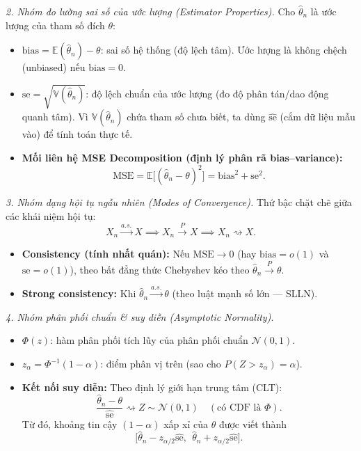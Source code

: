 \textit{2. Nhóm đo lường sai số của ước lượng (Estimator Properties).} Cho $\widehat\theta_n$ là ước lượng của tham số đích $\theta$:
\begin{itemize}
\item $\mathrm{bias}=\mathbb{E}(\widehat\theta_n)-\theta$: sai số hệ thống (độ lệch tâm). Ước lượng là không chệch (unbiased) nếu $\mathrm{bias}=0$.
\item $\mathrm{se}=\sqrt{\mathbb{V}(\widehat\theta_n)}$: độ lệch chuẩn của ước lượng (đo độ phân tán/dao động quanh tâm). Vì $\mathbb{V}(\widehat\theta_n)$ chứa tham số chưa biết, ta dùng $\widehat{\mathrm{se}}$ (cắm dữ liệu mẫu vào) để tính toán thực tế.
\item \textbf{Mối liên hệ MSE Decomposition (định lý phân rã bias--variance):}
\[ \mathrm{MSE}=\mathbb{E}\big[(\widehat\theta_n-\theta)^2\big]=\mathrm{bias}^2+\mathrm{se}^2. \]
\end{itemize}

\textit{3. Nhóm dạng hội tụ ngẫu nhiên (Modes of Convergence).} Thứ bậc chặt chẽ giữa các khái niệm hội tụ:
\[ X_n\xrightarrow{a.s.}X \implies X_n\xrightarrow{P}X \implies X_n\rightsquigarrow X. \]
\begin{itemize}
\item \textbf{Consistency (tính nhất quán):} Nếu $\mathrm{MSE}\to 0$ (hay $\mathrm{bias}=o(1)$ và $\mathrm{se}=o(1)$), theo bất đẳng thức Chebyshev kéo theo $\widehat\theta_n\xrightarrow{P}\theta$.
\item \textbf{Strong consistency:} Khi $\widehat\theta_n\xrightarrow{a.s.}\theta$ (theo luật mạnh số lớn --- SLLN).
\end{itemize}

\textit{4. Nhóm phân phối chuẩn \& suy diễn (Asymptotic Normality).}
\begin{itemize}
\item $\Phi(z)$: hàm phân phối tích lũy của phân phối chuẩn $\mathcal{N}(0,1)$.
\item $z_\alpha=\Phi^{-1}(1-\alpha)$: điểm phân vị trên (sao cho $P(Z>z_\alpha)=\alpha$).
\item \textbf{Kết nối suy diễn:} Theo định lý giới hạn trung tâm (CLT):
\[ \frac{\widehat\theta_n-\theta}{\widehat{\mathrm{se}}}\rightsquigarrow Z\sim\mathcal{N}(0,1)\quad(\text{có CDF là }\Phi). \]
Từ đó, khoảng tin cậy $(1-\alpha)$ xấp xỉ của $\theta$ được viết thành
\[ \Big[\widehat\theta_n-z_{\alpha/2}\widehat{\mathrm{se}},\ \ \widehat\theta_n+z_{\alpha/2}\widehat{\mathrm{se}}\Big]. \]
\end{itemize}

